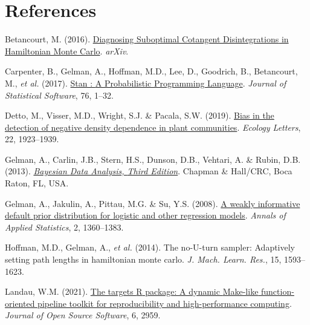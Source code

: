 \documentclass[
  12pt,
  letterpaper,
  DIV=11,
  numbers=noendperiod]{scrartcl}
\newlength{\cslhangindent}
\newlength{\cslentryspacingunit} %
\newenvironment{CSLReferences}[2] %
 {%
  \setlength{\parindent}{0pt}
  \ifodd #1
  \let\oldpar\par
  \def\par{\hangindent=\cslhangindent\oldpar}
  \fi
  \setlength{\parskip}{#2\cslentryspacingunit}
 }%
 {}
\begin{document}
\newpage

\hypertarget{references}{%
\section*{References}\label{references}}

\hypertarget{refs}{}
\begin{CSLReferences}{1}{0}
\leavevmode{}%
Betancourt, M. (2016).
\href{https://doi.org/10.48550/arXiv.1604.00695}{Diagnosing {Suboptimal
Cotangent Disintegrations} in {Hamiltonian Monte Carlo}}. \emph{arXiv}.

\leavevmode{}%
Carpenter, B., Gelman, A., Hoffman, M.D., Lee, D., Goodrich, B.,
Betancourt, M., \emph{et al.} (2017).
\href{https://doi.org/10.18637/jss.v076.i01}{Stan : {A Probabilistic
Programming Language}}. \emph{Journal of Statistical Software}, 76,
1--32.

\leavevmode{}%
Detto, M., Visser, M.D., Wright, S.J. \& Pacala, S.W. (2019).
\href{https://doi.org/10.1111/ele.13372}{Bias in the detection of
negative density dependence in plant communities}. \emph{Ecology
Letters}, 22, 1923--1939.

\leavevmode{}%
Gelman, A., Carlin, J.B., Stern, H.S., Dunson, D.B., Vehtari, A. \&
Rubin, D.B. (2013).
\emph{\href{https://books.google.com.pa/books?id=eSHSBQAAQBAJ}{Bayesian
{Data Analysis}, {Third Edition}}}. {Chapman \& Hall/CRC}, {Boca Raton,
FL, USA.}

\leavevmode{}%
Gelman, A., Jakulin, A., Pittau, M.G. \& Su, Y.S. (2008).
\href{https://doi.org/10.1214/08-AOAS191}{A weakly informative default
prior distribution for logistic and other regression models}.
\emph{Annals of Applied Statistics}, 2, 1360--1383.

\leavevmode{}%
Hoffman, M.D., Gelman, A., \emph{et al.} (2014). The no-{U-turn}
sampler: Adaptively setting path lengths in hamiltonian monte carlo.
\emph{J. Mach. Learn. Res.}, 15, 1593--1623.

\leavevmode{}%
Landau, W.M. (2021). \href{https://doi.org/10.21105/joss.02959}{The
targets {R} package: A dynamic {Make-like} function-oriented pipeline
toolkit for reproducibility and high-performance computing}.
\emph{Journal of Open Source Software}, 6, 2959.


\end{CSLReferences}
\end{document}
